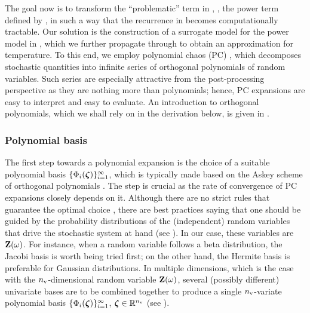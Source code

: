 The goal now is to transform the ``problematic'' term in , \ie, the power term defined by , in such a way that the recurrence in  becomes computationally tractable.
Our solution is the construction of a surrogate model for the power model in , which we further propagate through  to obtain an approximation for temperature.
To this end, we employ polynomial chaos (PC) \cite{xiu2010}, which decomposes stochastic quantities into infinite series of orthogonal polynomials of random variables.
Such series are especially attractive from the post-processing perspective as they are nothing more than polynomials; hence, PC expansions are easy to interpret and easy to evaluate.
An introduction to orthogonal polynomials, which we shall rely on in the derivation below, is given in .

\subsubsection{Polynomial basis}
The first step towards a polynomial expansion is the choice of a suitable polynomial basis $\{ \Phi_i(\boldsymbol{\zeta}) \}_{i = 1}^\infty$, which is typically made based on the Askey scheme of orthogonal polynomials \cite{xiu2010}.
The step is crucial as the rate of convergence of PC expansions closely depends on it.
Although there are no strict rules that guarantee the optimal choice \cite{maitre2010, knio2006}, there are best practices saying that one should be guided by the probability distributions of the (independent) random variables that drive the stochastic system at hand (see ).
In our case, these variables are $\mathbf{Z}(\omega)$.
For instance, when a random variable follows a beta distribution, the Jacobi basis is worth being tried first; on the other hand, the Hermite basis is preferable for Gaussian distributions.
In multiple dimensions, which is the case with the ${n_\text{v}}$-dimensional random variable $\mathbf{Z}(\omega)$, several (possibly different) univariate bases are to be combined together to produce a single ${n_\text{v}}$-variate polynomial basis $\{ \Phi_i(\boldsymbol{\zeta}) \}_{i = 1}^\infty$, $\boldsymbol{\zeta} \in \mathbb{R}^{n_\text{v}}$ (see \cite{xiu2010, maitre2010}).

